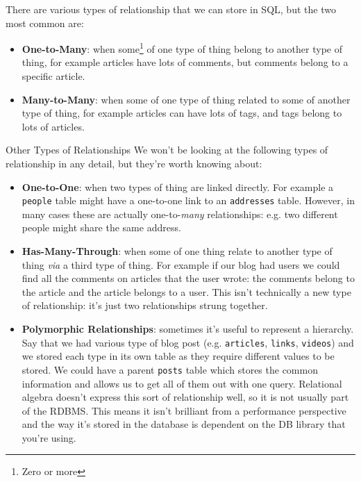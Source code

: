 There are various types of relationship that we can store in SQL, but the two most common are:

\begin{itemize}
    \item \textbf{One-to-Many}: when some\footnote{Zero or more} of one type of thing belong to another type of thing, for example articles have lots of comments, but comments belong to a specific article.
    \item \textbf{Many-to-Many}: when some of one type of thing related to some of another type of thing, for example articles can have lots of tags, and tags belong to lots of articles.
\end{itemize}

\begin{infobox}{Other Types of Relationships}
    We won't be looking at the following types of relationship in any detail, but they're worth knowing about:

    \begin{itemize}[leftmargin=*]
        \item \textbf{One-to-One}: when two types of thing are linked directly. For example a \texttt{people} table might have a one-to-one link to an \texttt{addresses} table. However, in many cases these are actually one-to-\textit{many} relationships: e.g. two different people might share the same address.
        \item \textbf{Has-Many-Through}: when some of one thing relate to another type of thing \textit{via} a third type of thing. For example if our blog had users we could find all the comments on articles that the user wrote: the comments belong to the article and the article belongs to a user. This isn't technically a new type of relationship: it's just two relationships strung together.
        \item \textbf{Polymorphic Relationships}: sometimes it's useful to represent a hierarchy. Say that we had various type of blog post (e.g. \texttt{articles}, \texttt{links}, \texttt{videos}) and we stored each type in its own table as they require different values to be stored. We could have a parent \texttt{posts} table which stores the common information and allows us to get all of them out with one query. Relational algebra doesn't express this sort of relationship well, so it is not usually part of the RDBMS. This means it isn't brilliant from a performance perspective and the way it's stored in the database is dependent on the DB library that you're using.
    \end{itemize}
\end{infobox}


